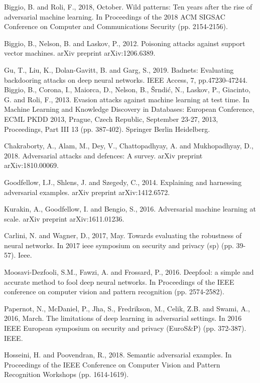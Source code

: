 \begin{singlespace}
\begin{thebibliography}{}
  Biggio, B. and Roli, F., 2018, October. Wild patterns: Ten years after the rise of adversarial machine learning. In Proceedings of the 2018 ACM SIGSAC Conference on Computer and Communications Security (pp. 2154-2156).

 Biggio, B., Nelson, B. and Laskov, P., 2012. Poisoning attacks against support vector machines. arXiv preprint arXiv:1206.6389.


 Gu, T., Liu, K., Dolan-Gavitt, B. and Garg, S., 2019. Badnets: Evaluating backdooring attacks on deep neural networks. IEEE Access, 7, pp.47230-47244.
 Biggio, B., Corona, I., Maiorca, D., Nelson, B., Šrndić, N., Laskov, P., Giacinto, G. and Roli, F., 2013. Evasion attacks against machine learning at test time. In Machine Learning and Knowledge Discovery in Databases: European Conference, ECML PKDD 2013, Prague, Czech Republic, September 23-27, 2013, Proceedings, Part III 13 (pp. 387-402). Springer Berlin Heidelberg.

 Chakraborty, A., Alam, M., Dey, V., Chattopadhyay, A. and Mukhopadhyay, D., 2018. Adversarial attacks and defences: A survey. arXiv preprint arXiv:1810.00069.

 Goodfellow, I.J., Shlens, J. and Szegedy, C., 2014. Explaining and harnessing adversarial examples. arXiv preprint arXiv:1412.6572.  


 Kurakin, A., Goodfellow, I. and Bengio, S., 2016. Adversarial machine learning at scale. arXiv preprint arXiv:1611.01236.

 Carlini, N. and Wagner, D., 2017, May. Towards evaluating the robustness of neural networks. In 2017 ieee symposium on security and privacy (sp) (pp. 39-57). Ieee.

 Moosavi-Dezfooli, S.M., Fawzi, A. and Frossard, P., 2016. Deepfool: a simple and accurate method to fool deep neural networks. In Proceedings of the IEEE conference on computer vision and pattern recognition (pp. 2574-2582).

 Papernot, N., McDaniel, P., Jha, S., Fredrikson, M., Celik, Z.B. and Swami, A., 2016, March. The limitations of deep learning in adversarial settings. In 2016 IEEE European symposium on security and privacy (EuroS\&P) (pp. 372-387). IEEE.

Hosseini, H. and Poovendran, R., 2018. Semantic adversarial examples. In Proceedings of the IEEE Conference on Computer Vision and Pattern Recognition Workshops (pp. 1614-1619).


\end{thebibliography}
\end{singlespace}
